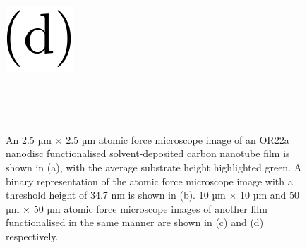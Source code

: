 \documentclass[
  a4paper,
]{scrbook}
\begin{document}
\begin{figure}
\begin{minipage}[t]{0.03\linewidth}
{{\includegraphics{figures/(d).png}

}

}

\end{minipage}%
%
\begin{minipage}[t]{0.01\linewidth}

{\centering 

~

}

\end{minipage}%
%
\begin{minipage}[t]{0.45\linewidth}

{\centering 


}

\end{minipage}%
%
\begin{minipage}[t]{0.01\linewidth}

{\centering 

~

}

\end{minipage}%

\caption{\label{fig-solvent-deposited-AFM-comparison}An 2.5 µm
\(\times\) 2.5 µm atomic force microscope image of an OR22a nanodisc
functionalised solvent-deposited carbon nanotube film is shown in (a),
with the average substrate height highlighted green. A binary
representation of the atomic force microscope image with a threshold
height of 34.7 nm is shown in (b). 10 µm \(\times\) 10 µm and 50 µm
\(\times\) 50 µm atomic force microscope images of another film
functionalised in the same manner are shown in (c) and (d)
respectively.}

\end{figure}
\end{document}
